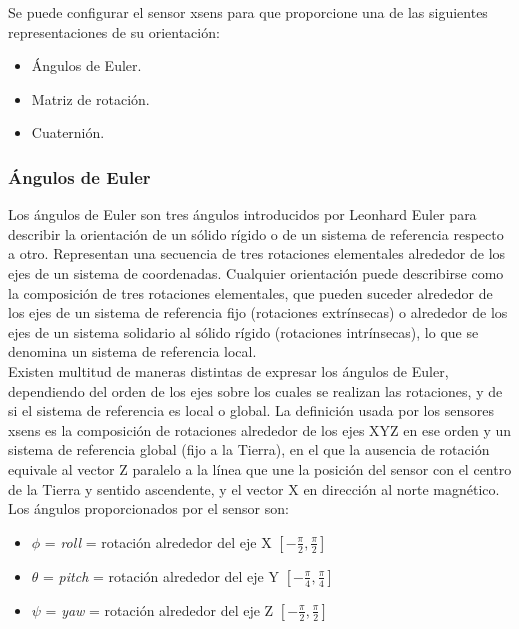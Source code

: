 \documentclass[10pt, a4paper]{report}
\begin{document}
Se puede configurar el sensor xsens para que proporcione una de las siguientes representaciones de su orientación:

\begin{itemize}

\item Ángulos de Euler.
\item Matriz de rotación.
\item Cuaternión. 

\end{itemize}

\subsubsection{Ángulos de Euler}

Los ángulos de Euler son tres ángulos introducidos por Leonhard Euler para describir la orientación de un sólido rígido o de un sistema de referencia respecto a otro. Representan una secuencia de tres rotaciones elementales alrededor de los ejes de un sistema de coordenadas. Cualquier orientación puede describirse como la composición de tres rotaciones elementales, que pueden suceder alrededor de los ejes de un sistema de referencia fijo (rotaciones extrínsecas) o alrededor de los ejes de un sistema solidario al sólido rígido (rotaciones intrínsecas), lo que se denomina un sistema de referencia local. \\

Existen multitud de maneras distintas de expresar los ángulos de Euler, dependiendo del orden de los ejes sobre los cuales se realizan las rotaciones, y de si el sistema de referencia es local o global. La definición usada por los sensores xsens es la composición de rotaciones alrededor de los ejes XYZ en ese orden y un sistema de referencia global (fijo a la Tierra), en el que la ausencia de rotación equivale al vector Z paralelo a la línea que une la posición del sensor con el centro de la Tierra y sentido ascendente, y el vector X en dirección al norte magnético. \\

Los ángulos proporcionados por el sensor son:

\begin{itemize}

\item $\phi$ = \textit{roll} = rotación alrededor del eje X $[-\frac{\pi}{2}, \frac{\pi}{2}]$

\item $\theta$ = \textit{pitch} = rotación alrededor del eje Y $[-\frac{\pi}{4}, \frac{\pi}{4}]$

\item $\psi$ = \textit{yaw} = rotación alrededor del eje Z $[-\frac{\pi}{2}, \frac{\pi}{2}]$

\end{itemize}
\end{document}
